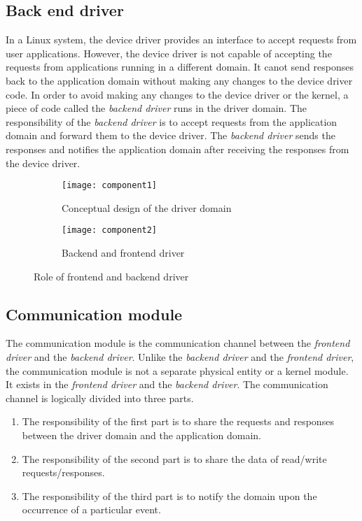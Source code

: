 \subsection{Back end driver}
\label{subsec:backend}
In a Linux system, the device driver provides an interface to accept requests from user applications. However, the device driver is not capable of accepting the requests from applications running in a different domain. It canot send responses back to the application domain without making any changes to the device driver code. In order to avoid making any changes to the device driver or the kernel, a piece of code called the \textit{backend driver} runs in the driver domain. The responsibility of the \textit{backend driver} is to accept requests from the application domain and forward them to the device driver. The \textit{backend driver} sends the responses and notifies the application domain after receiving the responses from the device driver.
\begin{figure}[!ht]
    \centering
    \begin{subfigure}[b]{0.45\textwidth}
	\texttt{[image: component1]}
	\caption{Conceptual design of the driver domain}
	\label{fig:conept}
    \end{subfigure}
	\hfill
    \begin{subfigure}[b]{0.45\textwidth}
	\texttt{[image: component2]}
	\caption{Backend and frontend driver}
	\label{fig:backendfrontend}
    \end{subfigure}
    \caption{Role of frontend and backend driver}\label{fig:fault tolerence}
\end{figure}

\subsection{Communication module}
\label{sub:communicationmodule}
The communication module is the communication channel between the \textit{frontend driver} and the \textit{backend driver}. Unlike the \textit{backend driver} and the \textit{frontend driver}, the communication module is not a separate physical entity or a kernel module. It exists in the \textit{frontend driver} and the \textit{backend driver}. The communication channel is logically divided into three parts. 
\begin{enumerate} 
\item The responsibility of the first part is to share the requests and responses between the driver domain and the application domain.
\item The responsibility of the second part is to share the data of read/write requests/responses.
\item The responsibility of the third part is to notify the domain upon the occurrence of a particular event. 
\end{enumerate}

